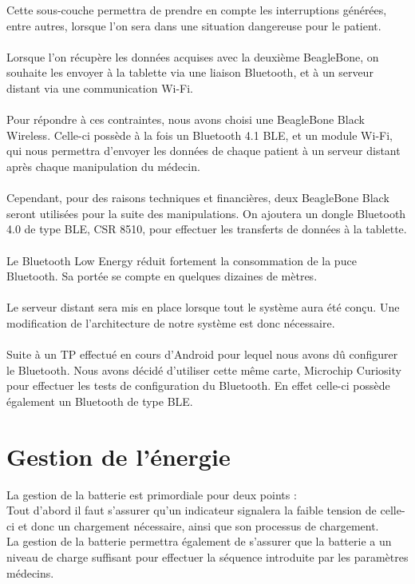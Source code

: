 \documentclass{report}
\begin{document}
Cette sous-couche permettra de prendre en compte les interruptions g\'{e}n\'{e}r\'{e}es, entre
autres, lorsque l’on sera dans une situation dangereuse pour le patient.\\ \\

Lorsque l’on r\'{e}cup\`{e}re les donn\'{e}es acquises avec la deuxi\`{e}me BeagleBone, on souhaite les
envoyer \`{a} la tablette via une liaison Bluetooth, et \`{a} un serveur distant via une
communication Wi-Fi. \\ \\

Pour r\'{e}pondre \`{a} ces contraintes, nous avons choisi une BeagleBone Black Wireless. Celle-ci
poss\`{e}de \`{a} la fois un Bluetooth 4.1 BLE, et un module Wi-Fi, qui nous permettra d’envoyer les
donn\'{e}es de chaque patient \`{a} un serveur distant apr\`{e}s chaque manipulation du m\'{e}decin. \\ \\

Cependant, pour des raisons techniques et financi\`{e}res, deux BeagleBone Black seront
utilis\'{e}es pour la suite des manipulations. On ajoutera un dongle Bluetooth 4.0 de type BLE,
CSR 8510, pour effectuer les transferts de donn\'{e}es \`{a} la tablette. \\ \\

Le Bluetooth Low Energy r\'{e}duit fortement la consommation de la puce Bluetooth. Sa port\'{e}e
se compte en quelques dizaines de m\`{e}tres.\\ \\

Le serveur distant sera mis en place lorsque tout le syst\`{e}me aura \'{e}t\'{e} conçu.
Une modification de l’architecture de notre syst\`{e}me est donc n\'{e}cessaire.\\ \\

Suite \`{a} un TP effectu\'{e} en cours d’Android pour lequel nous avons dû configurer le Bluetooth.
Nous avons d\'{e}cid\'{e} d’utiliser cette m\^{e}me carte, Microchip Curiosity pour effectuer les tests
de configuration du Bluetooth. En effet celle-ci poss\`{e}de \'{e}galement un Bluetooth de type
BLE.


\section{Gestion de l'\'{e}nergie}

La gestion de la batterie est primordiale pour deux points : \\
Tout d’abord il faut s’assurer qu’un indicateur signalera la faible tension de celle-ci et donc
un chargement n\'{e}cessaire, ainsi que son processus de chargement.\\
La gestion de la batterie permettra \'{e}galement de s’assurer que la batterie a un niveau de
charge suffisant pour effectuer la s\'{e}quence introduite par les param\`{e}tres m\'{e}decins.\\ \\
\end{document}
